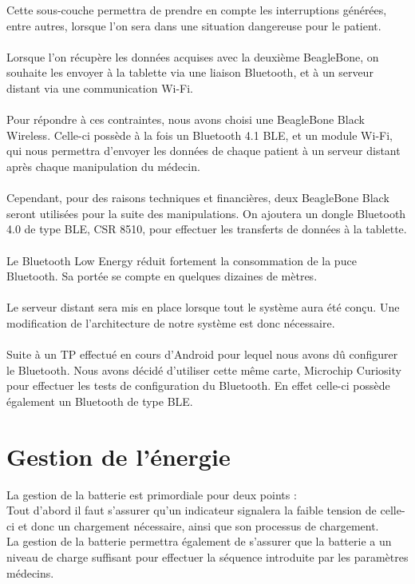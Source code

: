 \documentclass{report}
\begin{document}
Cette sous-couche permettra de prendre en compte les interruptions g\'{e}n\'{e}r\'{e}es, entre
autres, lorsque l’on sera dans une situation dangereuse pour le patient.\\ \\

Lorsque l’on r\'{e}cup\`{e}re les donn\'{e}es acquises avec la deuxi\`{e}me BeagleBone, on souhaite les
envoyer \`{a} la tablette via une liaison Bluetooth, et \`{a} un serveur distant via une
communication Wi-Fi. \\ \\

Pour r\'{e}pondre \`{a} ces contraintes, nous avons choisi une BeagleBone Black Wireless. Celle-ci
poss\`{e}de \`{a} la fois un Bluetooth 4.1 BLE, et un module Wi-Fi, qui nous permettra d’envoyer les
donn\'{e}es de chaque patient \`{a} un serveur distant apr\`{e}s chaque manipulation du m\'{e}decin. \\ \\

Cependant, pour des raisons techniques et financi\`{e}res, deux BeagleBone Black seront
utilis\'{e}es pour la suite des manipulations. On ajoutera un dongle Bluetooth 4.0 de type BLE,
CSR 8510, pour effectuer les transferts de donn\'{e}es \`{a} la tablette. \\ \\

Le Bluetooth Low Energy r\'{e}duit fortement la consommation de la puce Bluetooth. Sa port\'{e}e
se compte en quelques dizaines de m\`{e}tres.\\ \\

Le serveur distant sera mis en place lorsque tout le syst\`{e}me aura \'{e}t\'{e} conçu.
Une modification de l’architecture de notre syst\`{e}me est donc n\'{e}cessaire.\\ \\

Suite \`{a} un TP effectu\'{e} en cours d’Android pour lequel nous avons dû configurer le Bluetooth.
Nous avons d\'{e}cid\'{e} d’utiliser cette m\^{e}me carte, Microchip Curiosity pour effectuer les tests
de configuration du Bluetooth. En effet celle-ci poss\`{e}de \'{e}galement un Bluetooth de type
BLE.


\section{Gestion de l'\'{e}nergie}

La gestion de la batterie est primordiale pour deux points : \\
Tout d’abord il faut s’assurer qu’un indicateur signalera la faible tension de celle-ci et donc
un chargement n\'{e}cessaire, ainsi que son processus de chargement.\\
La gestion de la batterie permettra \'{e}galement de s’assurer que la batterie a un niveau de
charge suffisant pour effectuer la s\'{e}quence introduite par les param\`{e}tres m\'{e}decins.\\ \\
\end{document}
